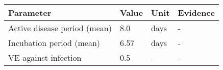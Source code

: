 \begin{tabular}{llll}
\toprule
                   Parameter & Value & Unit & Evidence \\
\midrule
Active disease period (mean) &   8.0 & days &        - \\
    Incubation period (mean) &  6.57 & days &        - \\
        VE against infection &   0.5 &    - &        - \\
\bottomrule
\end{tabular}
